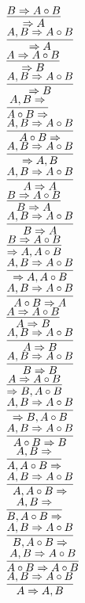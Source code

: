 \documentclass[11pt]{article}
\begin{document}
\begin{center}

$\infer{\Rightarrow A}{B\Rightarrow A\circ B}$
\bigskip
\\$\infer{\Rightarrow A}{A, B\Rightarrow A\circ B}$
\bigskip
\\$\infer{\Rightarrow B}{A\Rightarrow A\circ B}$
\bigskip
\\$\infer{\Rightarrow B}{A, B\Rightarrow A\circ B}$
\bigskip
\\$\infer{A\circ B\Rightarrow }{A, B\Rightarrow }$
\bigskip
\\$\infer{A\circ B\Rightarrow }{A, B\Rightarrow A\circ B}$
\bigskip
\\$\infer{\Rightarrow A, B}{A, B\Rightarrow A\circ B}$
\bigskip
\\$\infer{A\Rightarrow A}{A, B\Rightarrow A\circ B}$
\bigskip
\\$\infer{B\Rightarrow A}{B\Rightarrow A\circ B}$
\bigskip
\\$\infer{B\Rightarrow A}{A, B\Rightarrow A\circ B}$
\bigskip
\\$\infer{\Rightarrow A, A\circ B}{B\Rightarrow A\circ B}$
\bigskip
\\$\infer{\Rightarrow A, A\circ B}{A, B\Rightarrow A\circ B}$
\bigskip
\\$\infer{A\circ B\Rightarrow A}{A, B\Rightarrow A\circ B}$
\bigskip
\\$\infer{A\Rightarrow B}{A\Rightarrow A\circ B}$
\bigskip
\\$\infer{A\Rightarrow B}{A, B\Rightarrow A\circ B}$
\bigskip
\\$\infer{B\Rightarrow B}{A, B\Rightarrow A\circ B}$
\bigskip
\\$\infer{\Rightarrow B, A\circ B}{A\Rightarrow A\circ B}$
\bigskip
\\$\infer{\Rightarrow B, A\circ B}{A, B\Rightarrow A\circ B}$
\bigskip
\\$\infer{A\circ B\Rightarrow B}{A, B\Rightarrow A\circ B}$
\bigskip
\\$\infer{A, A\circ B\Rightarrow }{A, B\Rightarrow }$
\bigskip
\\$\infer{A, A\circ B\Rightarrow }{A, B\Rightarrow A\circ B}$
\bigskip
\\$\infer{B, A\circ B\Rightarrow }{A, B\Rightarrow }$
\bigskip
\\$\infer{B, A\circ B\Rightarrow }{A, B\Rightarrow A\circ B}$
\bigskip
\\$\infer{A\circ B\Rightarrow A\circ B}{A, B\Rightarrow A\circ B}$
\bigskip
\\$\infer{A\Rightarrow A, B}{A, B\Rightarrow A\circ B}$

\end{center}
\end{document}
